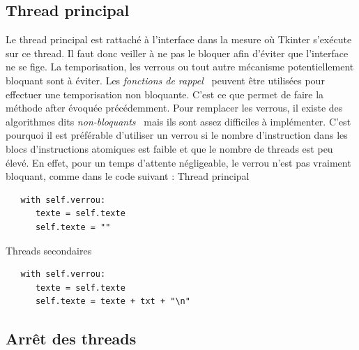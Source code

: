 \documentclass{article}
\begin{document}
\subsection{Thread principal}

Le thread principal est rattaché à l’interface dans la mesure où Tkinter s’exécute sur ce thread. Il faut donc veiller à ne pas le bloquer afin d’éviter que l’interface ne se fige. La temporisation, les verrous ou tout autre mécanisme potentiellement bloquant sont à éviter.
\medbreak
Les \textit{fonctions de rappel}~\cite{refFonctionRappel} peuvent être utilisées pour effectuer une temporisation non bloquante.
C’est ce que permet de faire la méthode after évoquée précédemment.
\medbreak
Pour remplacer les verrous, il existe des algorithmes dits \textit{non-bloquants}~\cite{refAlgoNonBloquant} mais ils sont assez difficiles à implémenter. C’est pourquoi il est préférable d’utiliser un verrou si le nombre d’instruction dans les blocs d’instructions atomiques est faible et que le nombre de threads est peu élevé. En effet, pour un temps d’attente négligeable, le verrou n’est pas vraiment bloquant, comme dans le code suivant :
\bigbreak
Thread principal
\begin{verbatim}
   with self.verrou:
      texte = self.texte
      self.texte = ""
\end{verbatim}
\bigbreak
Threads secondaires
\begin{verbatim}
   with self.verrou:
      texte = self.texte
      self.texte = texte + txt + "\n"
\end{verbatim}

\subsection{Arrêt des threads}
\end{document}
